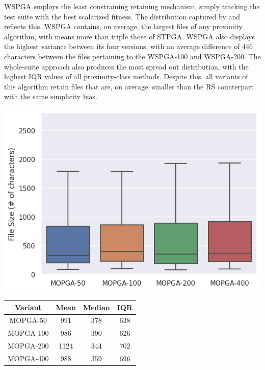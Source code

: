 \gls{WSPGA} employs the least constraining retaining mechanism,
simply tracking the test suite with the
best scalarized fitness.
The distribution captured by  and 
reflects this.
\gls{WSPGA} contains, on average, the largest files of any proximity algorithm,
with means more than triple those of \gls{STPGA}.
\gls{WSPGA} also displays the highest variance between its four
versions, with an average difference of 446 characters between
the files pertaining to the \gls{WSPGA}-100 and \gls{WSPGA}-200.
The whole-suite approach also produces the most spread out distribution,
with the highest \gls{IQR} values of all proximity-class methods.
Despite this, all variants of this algorithm retain files that are,
on average, smaller than the \gls{RS} counterpart with the same simplicity bias.

\begin{minipage}{\textwidth}
\vspace{0.25cm}
  \begin{minipage}[b]{0.49\textwidth}
    \centering
    \includegraphics[scale=0.4]{img/rq1-3/rq1-3-size-dist2.png}
    \label{fig:rq1-3size-dist2}
  \end{minipage}
  \hfill
  \begin{minipage}[b]{0.49\textwidth}
    \centering
\begin{tabular}{c|ccc}
    Variant & Mean & Median & \gls{IQR}\\
    \midrule
    \gls{MOPGA}-50 & 991 & 378 & 638\\
    \gls{MOPGA}-100 & 986 & 390 & 626\\
    \gls{MOPGA}-200 & 1124 & 344 & 702\\
    \gls{MOPGA}-400 & 988 & 359 & 696\\
\end{tabular}
\vfill
  \label{tab:rq1-3size-dist2}
\end{minipage}
\vspace{0.25cm}
\end{minipage}

